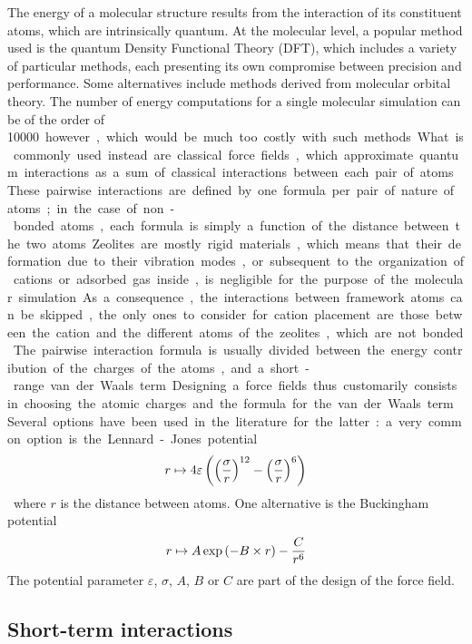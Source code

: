 \documentclass[main.tex]{subfiles}
\begin{document}
\label{forcefields}

The energy of a molecular structure results from the interaction of its constituent atoms, which are intrinsically quantum. At the molecular level, a popular method used is the quantum Density Functional Theory (DFT), which includes a variety of particular methods, each presenting its own compromise between precision and performance. Some alternatives include methods derived from molecular orbital theory. The number of energy computations for a single molecular simulation can be of the order of \qty{10000} however, which would be much too costly with such methods.

What is commonly used instead are classical force fields, which approximate quantum interactions as a sum of classical interactions between each pair of atoms. These pairwise interactions are defined by one formula per pair of nature of atoms; in the case of non-bonded atoms, each formula is simply a function of the distance between the two atoms. Zeolites are mostly rigid materials, which means that their deformation due to their vibration modes, or subsequent to the organization of cations or adsorbed gas inside, is negligible for the purpose of the molecular simulation. As a consequence, the interactions between framework atoms can be skipped, the only ones to consider for cation placement are those between the cation and the different atoms of the zeolites, which are not bonded.

The pairwise interaction formula is usually divided between the energy contribution of the charges of the atoms, and a short-range van der Waals term. Designing a force fields thus customarily consists in choosing the atomic charges and the formula for the van der Waals term. Several options have been used in the literature for the latter: a very common option is the Lennard-Jones potential
\[r\mapsto 4\varepsilon\left(\left(\frac \sigma r\right)^{12} - \left(\frac \sigma r\right)^6\right)\label{eq:LJ}\]
where $r$ is the distance between atoms. One alternative is the Buckingham potential
\[r\mapsto A\exp\left(-B\times r\right) - \frac C{r^6}\label{eq:Buckingham}\]
The potential parameter $\varepsilon$, $\sigma$, $A$, $B$ or $C$ are part of the design of the force field.

\subsection{Short-term interactions}
\end{document}
